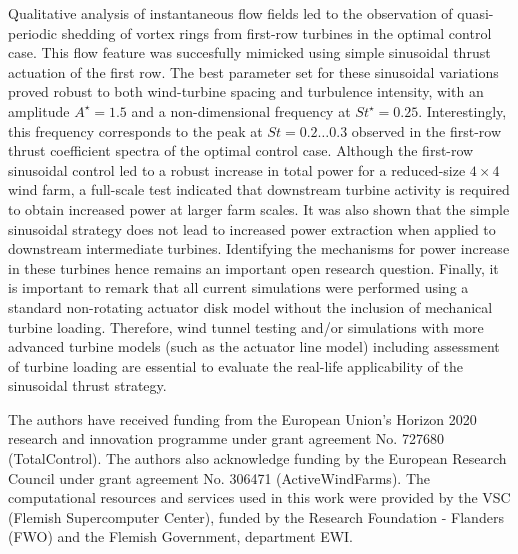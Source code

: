 \documentclass[wes, manuscript]{copernicus}
\begin{document}
Qualitative analysis of instantaneous flow fields led to the observation of quasi-periodic shedding of vortex rings from first-row turbines in the optimal control case. This flow feature was succesfully mimicked using simple sinusoidal thrust actuation of the first row. The best parameter set for these sinusoidal variations proved robust to both wind-turbine spacing and turbulence intensity, with an amplitude $A^\star = 1.5$ and a non-dimensional frequency at $St^\star = 0.25$. Interestingly, this frequency corresponds to the peak at $St = 0.2 \dots 0.3$ observed in the first-row thrust coefficient spectra of the optimal control case. Although the first-row sinusoidal control led to a robust increase in total power for a reduced-size $4\times4$ wind farm, a full-scale test indicated that downstream turbine activity is required to obtain increased power at larger farm scales. It was also shown that the simple sinusoidal strategy does not lead to increased power extraction when applied to downstream intermediate turbines. Identifying the mechanisms for power increase in these turbines hence remains an important open research question. Finally, it is important to remark that all current simulations were performed using a standard non-rotating actuator disk model without the inclusion of mechanical turbine loading. Therefore, wind tunnel testing and/or simulations with more advanced turbine models (such as the actuator line model) including assessment of turbine loading are essential to evaluate the real-life applicability of the sinusoidal thrust strategy. 





\begin{acknowledgements}
The authors have received funding from the European Union's Horizon 2020 research and innovation programme under grant agreement No. 727680 (TotalControl). The authors also acknowledge funding by the European Research Council under grant agreement No. 306471 (ActiveWindFarms). The computational resources and services used in this work were provided by the VSC (Flemish Supercomputer Center), funded by the Research Foundation - Flanders (FWO) and the Flemish Government, department EWI.
\end{acknowledgements}
\end{document}
